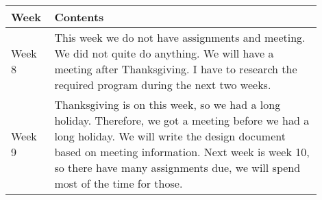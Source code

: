 \documentclass[10pt]{article}
\begin{document}
\begin{center}
        \begin{tabular}{ | p{0.1\linewidth} | p{0.8\linewidth} | } \hline
            Week & Contents  \\ \hline                     
            Week 8 & This week we do not have assignments and meeting. We did not quite do anything. We will have a meeting after Thanksgiving. I have to research the required program during the next two weeks.  \\ \hline 
            Week 9 & Thanksgiving is on this week, so we had a long holiday. Therefore, we got a meeting before we had a long holiday. We will write the design document based on meeting information. Next week is week 10, so there have many assignments due, we will spend most of the time for those.  \\ \hline 
        \end{tabular}
        \end{center}
    
\end{document}

